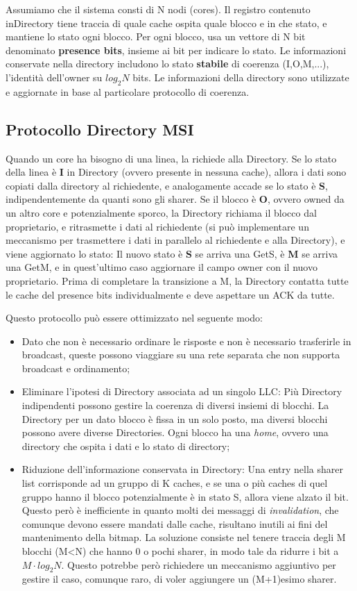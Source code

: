 Assumiamo che il sistema consti di N nodi (cores). Il registro contenuto inDirectory tiene traccia di quale cache ospita quale blocco e in che stato, e mantiene lo stato ogni blocco. Per ogni blocco, usa un vettore di N bit denominato \textbf{presence bits}, insieme ai bit per indicare lo stato. Le informazioni conservate nella directory includono lo stato \textbf{stabile} di coerenza (I,O,M,...), l'identità dell'owner su $log_2N$ bits. Le informazioni della directory sono utilizzate e aggiornate in base al particolare protocollo di coerenza. 

\subsection{Protocollo Directory MSI}
Quando un core ha bisogno di una linea, la richiede alla Directory. Se lo stato della linea è \textbf{I} in Directory (ovvero presente in nessuna cache), allora i dati sono copiati dalla directory al richiedente, e analogamente accade se lo stato è \textbf{S}, indipendentemente da quanti sono gli sharer. Se il blocco è \textbf{O}, ovvero owned da un altro core e potenzialmente sporco, la Directory richiama il blocco dal proprietario, e ritrasmette i dati al richiedente (si può implementare un meccanismo per trasmettere i dati in parallelo al richiedente e alla Directory), e viene aggiornato lo stato: Il nuovo stato è \textbf{S} se arriva una GetS, è \textbf{M} se arriva una GetM, e in quest'ultimo caso aggiornare il campo owner con il nuovo proprietario. Prima di completare la transizione a M, la Directory contatta tutte le cache del presence bits individualmente e deve aspettare un ACK da tutte.

\noindent Questo protocollo può essere ottimizzato nel seguente modo:
\begin{itemize}
    \item Dato che non è necessario ordinare le risposte e non è necessario trasferirle in broadcast, queste possono viaggiare su una rete separata che non supporta broadcast e ordinamento;
    \item Eliminare l'ipotesi di Directory associata ad un singolo LLC: Più Directory indipendenti possono gestire la coerenza di diversi insiemi di blocchi. La Directory per un dato blocco è fissa in un solo posto, ma diversi blocchi possono avere diverse Directories. Ogni blocco ha una \textit{home}, ovvero una directory che ospita i dati e lo stato di directory;
    \item Riduzione dell'informazione conservata in Directory: Una entry nella sharer list corrisponde ad un gruppo di K caches, e se una o più caches di quel gruppo hanno il blocco potenzialmente è in stato S, allora viene alzato il bit. Questo però è inefficiente in quanto molti dei messaggi di \textit{invalidation}, che comunque devono essere mandati dalle cache, risultano inutili ai fini del mantenimento della bitmap. La soluzione consiste nel tenere traccia degli M blocchi (M<N) che hanno 0 o pochi sharer, in modo tale da ridurre i bit a $M\cdot log_2N$. Questo potrebbe però richiedere un meccanismo aggiuntivo per gestire il caso, comunque raro, di voler aggiungere un (M+1)esimo sharer.  
\end{itemize}

